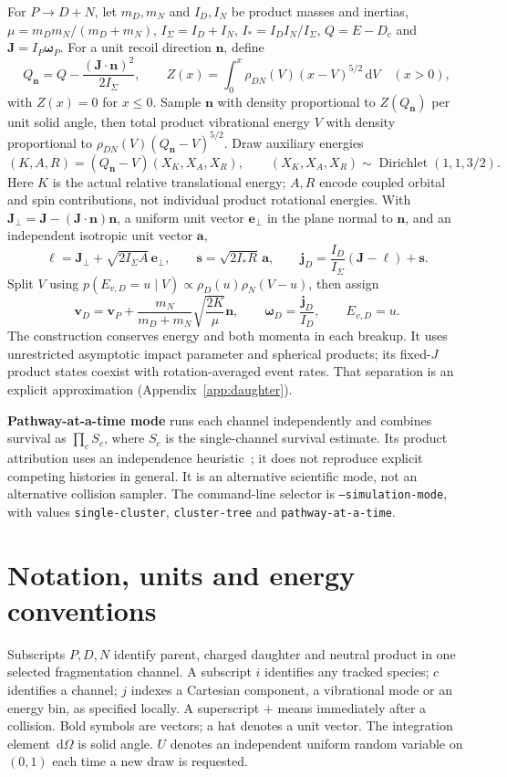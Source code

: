\documentclass[10pt,a4paper]{article}
\newcommand{\dd}{\,\mathrm d}
\newcommand{\Dir}{\operatorname{Dirichlet}}
\begin{document}
For $P\to D+N$, let $m_D,m_N$ and $I_D,I_N$ be product masses and inertias,
$\mu=m_Dm_N/(m_D+m_N)$, $I_\Sigma=I_D+I_N$,
$I_*=I_DI_N/I_\Sigma$, $Q=E-D_c$ and
$\mathbf J=I_P\boldsymbol\omega_P$. For a unit recoil direction $\mathbf n$,
define
\[
 Q_{\mathbf n}=Q-\frac{(\mathbf J\cdot\mathbf n)^2}{2I_\Sigma},\qquad
 Z(x)=\int_0^x\rho_{DN}(V)(x-V)^{5/2}\dd V
 \quad(x>0),
\]
with $Z(x)=0$ for $x\leq0$. Sample $\mathbf n$ with density proportional to
$Z(Q_{\mathbf n})$ per unit solid angle, then total product vibrational energy
$V$ with density proportional to $\rho_{DN}(V)(Q_{\mathbf n}-V)^{5/2}$.
Draw auxiliary energies
\[
 (K,A,R)=(Q_{\mathbf n}-V)(X_K,X_A,X_R),\qquad
 (X_K,X_A,X_R)\sim\Dir(1,1,3/2).
\]
Here $K$ is the actual relative translational energy; $A,R$ encode coupled
orbital and spin contributions, not individual product rotational energies.
With $\mathbf J_\perp=\mathbf J-(\mathbf J\cdot\mathbf n)\mathbf n$, a uniform
unit vector $\mathbf e_\perp$ in the plane normal to $\mathbf n$, and an
independent isotropic unit vector $\mathbf a$,
\[
 \boldsymbol\ell=\mathbf J_\perp+\sqrt{2I_\Sigma A}\,\mathbf e_\perp,
 \qquad \mathbf s=\sqrt{2I_*R}\,\mathbf a,
 \qquad \mathbf j_D=\frac{I_D}{I_\Sigma}(\mathbf J-\boldsymbol\ell)+\mathbf s.
\]
Split $V$ using $p(E_{v,D}=u\mid V)\propto\rho_D(u)\rho_N(V-u)$, then assign
\[
 \boxed{\mathbf v_D=\mathbf v_P+\frac{m_N}{m_D+m_N}
 \sqrt{\frac{2K}{\mu}}\mathbf n,\qquad
 \boldsymbol\omega_D=\frac{\mathbf j_D}{I_D},\qquad E_{v,D}=u.}
\]
The construction conserves energy and both momenta in each breakup. It uses
unrestricted asymptotic impact parameter and spherical products; its fixed-$J$
product states coexist with rotation-averaged event rates. That separation is
an explicit approximation (Appendix~\ref{app:daughter}).

\textbf{Pathway-at-a-time mode} runs each channel independently and combines
survival as $\prod_c S_c$, where $S_c$ is the single-channel survival estimate.
Its product attribution uses an independence heuristic~\cite{multipath}; it
does not reproduce explicit competing histories in general. It is an alternative
scientific mode, not an alternative collision sampler. The command-line selector
is \texttt{--simulation-mode}, with values \texttt{single-cluster},
\texttt{cluster-tree} and \texttt{pathway-at-a-time}.

\clearpage
\appendix
\section{Notation, units and energy conventions}\label{app:notation}
Subscripts $P,D,N$ identify parent, charged daughter and neutral product in one
selected fragmentation channel. A subscript $i$ identifies any tracked species;
$c$ identifies a channel; $j$ indexes a Cartesian component, a vibrational mode
or an energy bin, as specified locally. A superscript $+$ means immediately
after a collision. Bold symbols are vectors; a hat denotes a unit vector.
The integration element $\dd\Omega$ is solid angle. $U$ denotes an independent
uniform random variable on $(0,1)$ each time a new draw is requested.
\end{document}
